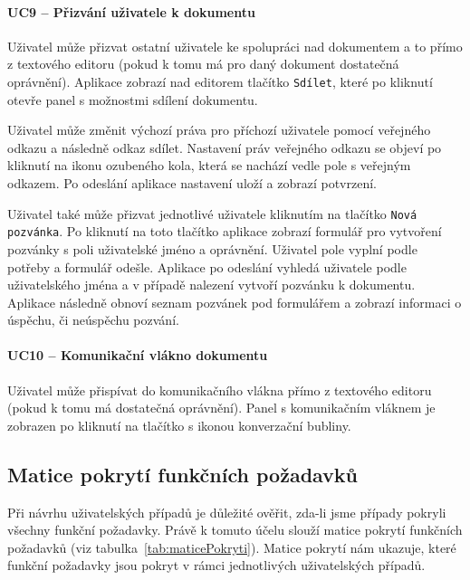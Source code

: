 \paragraph{UC9 -- Přizvání uživatele k dokumentu}

Uživatel může přizvat ostatní uživatele ke spolupráci nad dokumentem a to přímo z textového editoru (pokud k tomu má pro daný dokument dostatečná oprávnění).
Aplikace zobrazí nad editorem tlačítko \texttt{Sdílet}, které po kliknutí otevře panel s možnostmi sdílení dokumentu.

Uživatel může změnit výchozí práva pro příchozí uživatele pomocí veřejného odkazu a následně odkaz sdílet.
Nastavení práv veřejného odkazu se objeví po kliknutí na ikonu ozubeného kola, která se nachází vedle pole s veřejným odkazem.
Po odeslání aplikace nastavení uloží a zobrazí potvrzení.

Uživatel také může přizvat jednotlivé uživatele kliknutím na tlačítko \texttt{Nová pozvánka}.
Po kliknutí na toto tlačítko aplikace zobrazí formulář pro vytvoření pozvánky s poli uživatelské jméno a oprávnění.
Uživatel pole vyplní podle potřeby a formulář odešle.
Aplikace po odeslání vyhledá uživatele podle uživatelského jména a v případě nalezení vytvoří pozvánku k dokumentu.
Aplikace následně obnoví seznam pozvánek pod formulářem a zobrazí informaci o úspěchu, či neúspěchu pozvání.

\paragraph{UC10 -- Komunikační vlákno dokumentu}

Uživatel může přispívat do komunikačního vlákna přímo z textového editoru (pokud k tomu má dostatečná oprávnění).
Panel s komunikačním vláknem je zobrazen po kliknutí na tlačítko s ikonou konverzační bubliny.

\subsection{Matice pokrytí funkčních požadavků}\label{subsec:maticePokrytíFunkčníchPožadavků}

Při návrhu uživatelských případů je důležité ověřit, zda-li jsme případy pokryli všechny funkční požadavky.
Právě k tomuto účelu slouží matice pokrytí funkčních požadavků (viz tabulka~\ref{tab:maticePokryti}).
Matice pokrytí nám ukazuje, které funkční požadavky jsou pokryt v rámci jednotlivých uživatelských případů.

